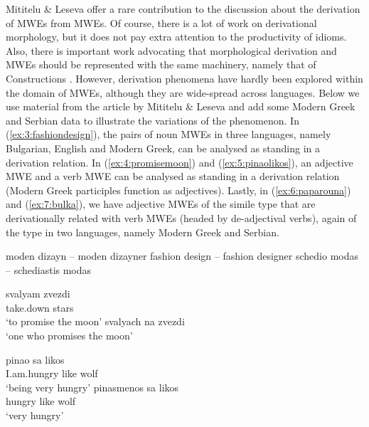 \documentclass[output=paper]{langsci/langscibook}
\begin{document}
 Mititelu \&  Leseva offer a rare contribution to the discussion about the derivation  of MWEs from MWEs.  Of course, there is a lot of work on derivational morphology, but it does not pay extra attention to the productivity of idioms. Also, there is important work advocating that morphological derivation and MWEs should be represented with the same machinery, namely that of Constructions \citep{Riehemann:01}. However, derivation phenomena  have hardly been explored within the domain of MWEs, although they are wide-spread across languages. Below we use material from the article by Mititelu \& Leseva and add some Modern Greek and Serbian data to illustrate the variations of the phenomenon. In (\ref{ex:3:fashiondesign}), the pairs of noun MWEs in three languages, namely Bulgarian, English and Modern Greek, can be analysed as standing in a derivation relation. In (\ref{ex:4:promisemoon}) and (\ref{ex:5:pinaolikos}), an adjective MWE and a verb MWE can be analysed as standing in a derivation relation (Modern Greek participles function as adjectives). Lastly, in (\ref{ex:6:paparouna}) and (\ref{ex:7:bulka}), we have adjective MWEs of the simile type that are derivationally related with verb MWEs (headed by de-adjectival verbs), again of the  type in two languages, namely Modern Greek and Serbian.


\begin{exe}

\ex \label{ex:3:fashiondesign}
\settowidth {}
\begin{xlist}
\ex moden dizayn – moden dizayner   
\ex fashion design – fashion designer   
\ex schedio modas – schediastis modas  
\end{xlist}
\end{exe}

\begin{exe}
\settowidth {}
\ex \label{ex:4:promisemoon}
\begin{xlist}
\ex
\gll 
svalyam zvezdi\\
 take.down stars \\  
\glt`to promise the moon’
\ex
svalyach na zvezdi\\ 
`one who promises the moon’
\end{xlist}
\end{exe}

\begin{exe}
\settowidth {}
\ex \label{ex:5:pinaolikos}
\begin{xlist}
\ex
\gll
pinao sa likos\\ 
       I.am.hungry like wolf \\ 
      \glt `being very hungry’
      \ex
\gll pinasmenos sa likos\\
hungry like wolf\\
\glt ‘very hungry’
\end{xlist}
\end{exe}
\end{document}
